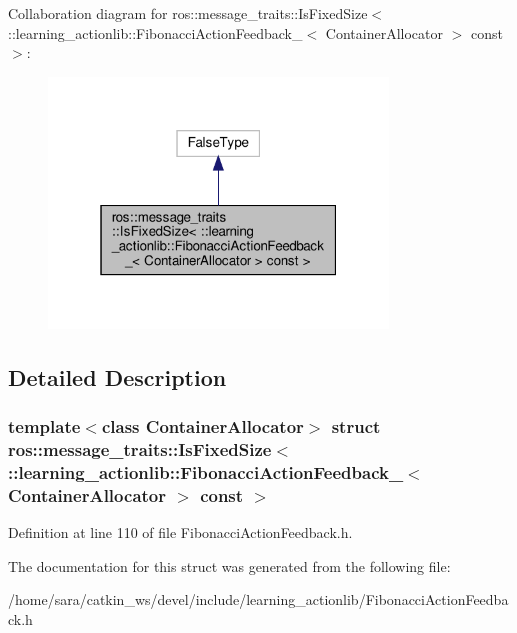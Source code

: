 Collaboration diagram for ros\+:\+:message\+\_\+traits\+:\+:Is\+Fixed\+Size$<$ \+:\+:learning\+\_\+actionlib\+:\+:Fibonacci\+Action\+Feedback\+\_\+$<$ Container\+Allocator $>$ const $>$\+:
\nopagebreak
\begin{figure}[H]
\begin{center}
\leavevmode
\includegraphics[width=256pt]{structros_1_1message__traits_1_1IsFixedSize_3_01_1_1learning__actionlib_1_1FibonacciActionFeedba2802b2bdc54a9c1c156d6853ffa12938}
\end{center}
\end{figure}


\subsection{Detailed Description}
\subsubsection*{template$<$class Container\+Allocator$>$\newline
struct ros\+::message\+\_\+traits\+::\+Is\+Fixed\+Size$<$ \+::learning\+\_\+actionlib\+::\+Fibonacci\+Action\+Feedback\+\_\+$<$ Container\+Allocator $>$ const $>$}



Definition at line 110 of file Fibonacci\+Action\+Feedback.\+h.



The documentation for this struct was generated from the following file\+:\begin{DoxyCompactItemize}
\item 
/home/sara/catkin\+\_\+ws/devel/include/learning\+\_\+actionlib/Fibonacci\+Action\+Feedback.\+h\end{DoxyCompactItemize}
